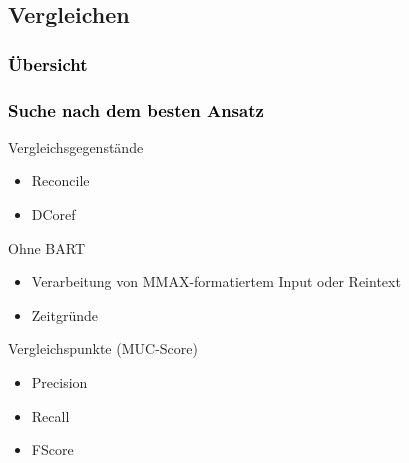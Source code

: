 \documentclass[xcolor=dvipsnames]{beamer}
\begin{document}
\subsection{Vergleichen}


\begin{frame}[plain]\frametitle{\textcolor{black}{Übersicht}}


\end{frame}

\addtocounter{framenumber}{-1}


\begin{frame}\frametitle{\textcolor{black}{Suche nach dem besten Ansatz}}

\begin{block}{Vergleichsgegenstände}
\begin{itemize}
\item Reconcile
\item DCoref
\end{itemize}
\end{block}

\begin{block}{Ohne BART}
\begin{itemize}
\item Verarbeitung von MMAX-formatiertem Input oder Reintext
\item Zeitgründe
\end{itemize}
\end{block}

\begin{block}{Vergleichspunkte (MUC-Score)}
  \begin{itemize}
    \item Precision
    \item Recall
    \item FScore
  \end{itemize}
\end{block}

\end{frame}

\end{document}
